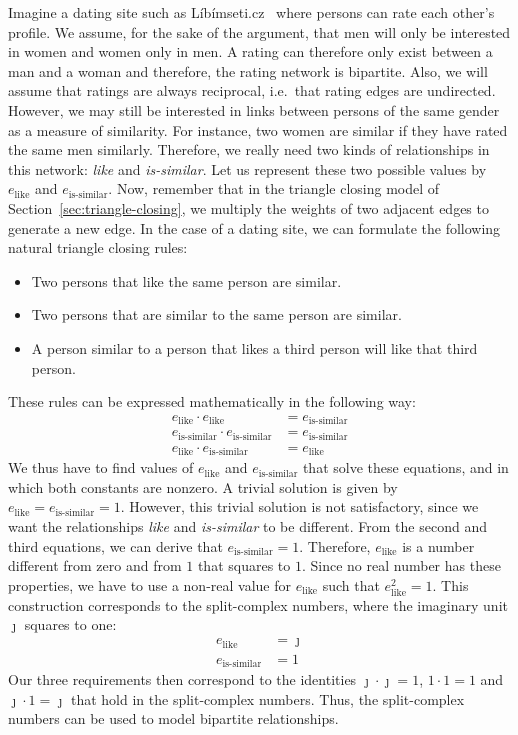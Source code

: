 \documentclass[11pt,a4paper]{book}
\begin{document}
Imagine a dating site such as Líbímseti.cz~\cite{b311} where persons can
rate each other's profile.  We assume, for the sake of the argument,
that men will only be interested in women and women only in men.  A
rating can therefore only exist between a man and a woman and therefore,
the rating network is bipartite.  Also, we will assume that ratings are
always reciprocal, i.e.\ that rating edges are undirected. 
However, we may still be interested
in links between persons of the same gender as a measure of similarity.
For instance, two women are similar if they have rated the same men
similarly.  Therefore, we really need two kinds of relationships in this
network:  \emph{like} and \emph{is-similar}.  Let us represent these two
possible values by $e_{\mathrm{like}}$ and $e_{\textrm{is-similar}}$.
Now, remember that in the triangle closing model of
Section~\ref{sec:triangle-closing}, 
we multiply the weights of two adjacent edges to generate a new edge.
In the case of a dating site, we can formulate the following natural 
triangle closing rules:  
\begin{itemize}
  \item Two persons that like the same person are similar.
  \item Two persons that are similar to the same person are similar.
  \item A person similar to a person that likes a third person
    will like that third person.
\end{itemize}
These rules can be expressed mathematically in the following way:
\begin{align*}
  e_{\mathrm{like}} \cdot e_{\mathrm{like}} &= e_{\textrm{is-similar}} \\
  e_{\textrm{is-similar}} \cdot e_{\textrm{is-similar}} &=
  e_{\textrm{is-similar}} \\
  e_{\mathrm{like}} \cdot e_{\textrm{is-similar}} &= e_{\mathrm{like}}
\end{align*}
We thus have to find values of $e_{\mathrm{like}}$ and
$e_{\textrm{is-similar}}$ that solve these equations, and in which both
constants are nonzero.
A trivial solution is
given by $e_{\mathrm{like}} = e_{\textrm{is-similar}} = 1$.  
However, this
trivial solution is not satisfactory, since we want the
relationships \emph{like} and \emph{is-similar} to be different.
From the second and third equations, we can derive that
$e_{\textrm{is-similar}}=1$.  Therefore, $e_{\mathrm{like}}$ is a number
different from zero and from $1$ that squares to $1$.  Since no real
number has these properties, we have to use a non-real value for
$e_{\mathrm{like}}$ such that $e_{\mathrm{like}}^2 = 1$.  This
construction corresponds to the split-complex numbers, where the
imaginary unit $\jmath$ squares to one:
\begin{align*}
  e_{\mathrm{like}} &= \jmath \\
  e_{\textrm{is-similar}} &= 1
\end{align*}
Our three requirements then correspond to the identities $\jmath \cdot \jmath
= 1$, $1 \cdot 1 = 1$ and $\jmath \cdot 1 = \jmath$ that hold in the
split-complex numbers.  Thus, the
split-complex numbers can be used to model bipartite relationships. 
\end{document}
